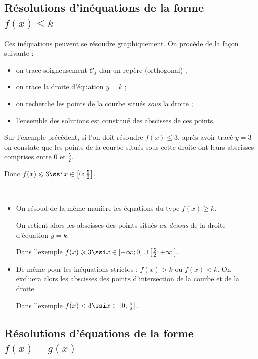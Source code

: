 
\subsection{R\'esolutions d'in\'equations de la forme $f(x)\leqslant k$}

Ces in\'equations peuvent se r\'esoudre graphiquement. On proc\`ede de la façon suivante :
\begin{itemize}
	\item on trace soigneusement $\mathcal{C}_f$ dan un rep\`ere (orthogonal) ;
	\item on trace la droite d'\'equation $y=k$ ;
	\item on recherche les points de la courbe situ\'es \emph{sous} la droite ;
	\item l'ensemble des solutions est constitu\'e des abscisses de ces points.
\end{itemize}

\begin{exemple*} Sur l'exemple pr\'ec\'edent, si l'on doit r\'esoudre $f(x)\leqslant 3$, apr\`es avoir trac\'e $y=3$ on constate que les points de la courbe situ\'es sous cette droite ont leurs abscisses comprises entre 0 et $\frac{5}{2}$.

Donc $f(x)\leqslant 3 \ssi x\in\left[0;\frac{5}{2}\right]$.
\end{exemple*}

\begin{rmq}~
\begin{itemize}
	\item On r\'esoud de la même mani\`ere les \'equations du type $f(x)\geqslant k$.

On retient alors les abscisses des points situ\'es \emph{au-dessus} de la droite d'\'equation $y=k$.

Dans l'exemple $f(x)\geqslant 3 \ssi x\in \left] -\infty ; 0 \right] \cup \left[\frac{5}{2} ; +\infty\right[$.
	\item De même pour les in\'equations strictes : $f(x)>k$ ou $f(x)<k$. On excluera alors les abscisses des points d'intersection de la courbe et de la droite.

	Dans l'exemple $f(x)<3 \ssi x\in \left]0;\frac{5}{2}\right[$.
\end{itemize}
\end{rmq}

\subsection{R\'esolutions d'\'equations de la forme $f(x)=g(x)$}

